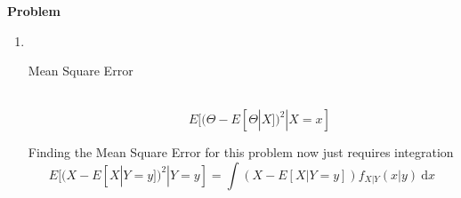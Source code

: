 \documentclass[12pt]{article}
\newenvironment{Ex}{\textbf{Problem}\vspace{.75em}\\}{}
\newcommand{\dd}[1]{\:\mathrm{d}{#1}}
\begin{document}
\begin{enumerate}
\begin{Ex}
\begin{solution}
\begin{enumerate}
\begin{equation}
\begin{aligned}
              & \frac{1}{y-2} &&\quad 2 \le x \le 3 \\
              & 1 &&\quad 3 < x < 11 \\
              & \frac{1}{13-y} &&\quad 11 < x < 12 \\
            \end{aligned} \right.
        \end{equation}
        So that now the expectation is easy to find
        \begin{equation}
          \label{eq:3a-expectation-piecewise}
          E[X|Y=y] = \left\{
            \begin{aligned}
              & \int_{2}^{y} \frac{1}{y-2}\dd{x} &&\quad 2 \le x \le 3 \\
              & \int_{y-1}^{y}\dd{x} &&\quad 3 < x < 11 \\
              & \int_{y-1}^{12}\frac{1}{13-y}\dd{x} &&\quad 11 < x < 12 \\
            \end{aligned} \right.
        \end{equation}
        Which turns out to be
        \begin{equation}
          \label{eq:3a-expectation-piecewise-sol}
          \implies E[X|Y=y] = \left\{
            \begin{aligned}
              & \frac{y+2}{2} &&\quad 2 \le x \le 3 \\
              & y-\frac{1}{2} &&\quad 3 < x < 11 \\
              & \frac{11+y}{2} &&\quad 11 < x < 12 \\
            \end{aligned} \right.
        \end{equation}
      \item \hfill \\
        \begin{mdframed}[backgroundcolor=silver]
          \begin{description}
          \item[Mean Square Error] \hfill \\
            $$E[(\Theta-E[\Theta|X])^2|X=x]$$
          \end{description}
        \end{mdframed}
        Finding the Mean Square Error for this problem now just
        requires integration
        \begin{equation}
          \label{eq:3b-mse-def}
          E[(X-E[X|Y=y])^2|Y=y] = \int (X-E[X|Y=y])f_{X|Y}(x|y) \dd{x}

\end{equation}
\end{enumerate}
\end{solution}
\end{Ex}
\end{enumerate}
\end{document}
